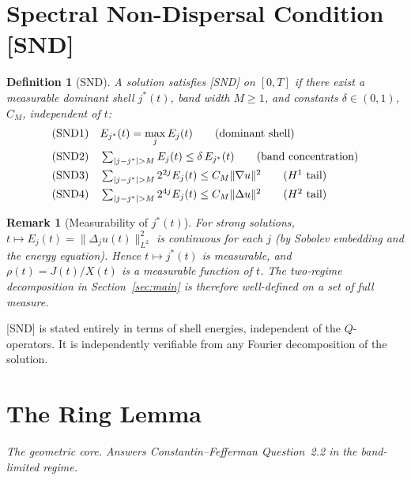 \documentclass[11pt]{article}
\newtheorem{definition}[theorem]{Definition}
\newtheorem{remark}[theorem]{Remark}
\begin{document}
\section{Spectral Non-Dispersal Condition [SND]}

\begin{definition}[SND]
A solution satisfies \emph{[SND]} on $[0,T]$ if there exist a measurable dominant shell
$j^*(t)$, band width $M\geq 1$, and constants $\delta\in(0,1)$, $C_M$, independent of $t$:
\begin{align}
&\textup{(SND1)}\quad E_{j^*}(t) = \max_j E_j(t)\tag{dominant shell}\\
&\textup{(SND2)}\quad \textstyle\sum_{|j-j^*|>M} E_j(t) \leq \delta\, E_{j^*}(t)\tag{band concentration}\\
&\textup{(SND3)}\quad \textstyle\sum_{|j-j^*|>M} 2^{2j} E_j(t) \leq C_M\|\nabla u\|^2\tag{$H^1$ tail}\\
&\textup{(SND4)}\quad \textstyle\sum_{|j-j^*|>M} 2^{4j} E_j(t) \leq C_M\|\Delta u\|^2\tag{$H^2$ tail}
\end{align}
\end{definition}

\begin{remark}[Measurability of $j^*(t)$]
For strong solutions, $t\mapsto E_j(t) = \|\Delta_j u(t)\|^2_{L^2}$ is continuous for each $j$
(by Sobolev embedding and the energy equation). Hence $t\mapsto j^*(t)$ is measurable, and
$\rho(t) = J(t)/X(t)$ is a measurable function of $t$. The two-regime decomposition in
Section~\ref{sec:main} is therefore well-defined on a set of full measure.
\end{remark}

[SND] is stated entirely in terms of shell energies, independent of the $Q$-operators.
It is independently verifiable from any Fourier decomposition of the solution.

\section{The Ring Lemma}

\textit{The geometric core. Answers Constantin--Fefferman Question~2.2 in the band-limited regime.}
\end{document}
